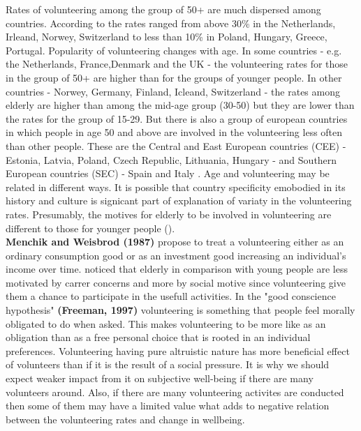\documentclass[10pt, letterpaper]{article}
\newcommand{\emd}[1]{\ExecuteMetaData[/tmp/tex]{#1}} %
\begin{document}
\begin{spacing}{1.4} %






Rates of volunteering among the group of 50+ are much dispersed among countries. According to \citet{Oecd16}the rates ranged from above 30\% in the Netherlands, Irleand, Norwey, Switzerland to less than 10\% in Poland, Hungary, Greece, Portugal. Popularity of volunteering changes with age. In some countries - e.g. the Netherlands, France,Denmark and the UK  - the volunteering rates for those in the group of 50+ are higher than for the groups of younger people. In other countries - Norwey, Germany, Finland, Icleand, Switzerland  - the rates among elderly are higher than among the mid-age group (30-50) but they are lower than the rates for the group of 15-29. But there is also a group of european countries in which people in age 50 and above are involved in the volunteering less often than other people. These are the Central and East European countries (CEE) - Estonia, Latvia, Poland, Czech Republic, Lithuania, Hungary - and  Southern European countries (SEC) - Spain and Italy \citet{Oecd16}.  Age and volunteering may be related in different ways. It is possible that country specificity emobodied in its history and culture is signicant part of explanation of variaty in the volunteering rates. Presumably, the motives for elderly to be involved in volunteering are different to those for younger people (\citet{wilson12}). \\

\textbf{Menchik and Weisbrod (1987)} propose to treat a volunteering either as an ordinary consumption good or as an investment good increasing an individual's income over time. \citet{haski09} noticed that elderly in comparison with young people are less motivated by carrer concerns and  more by social motive since volunteering give them  a  chance to participate in the usefull activities. In the "good conscience hypothesis" \textbf{(Freeman, 1997)} volunteering is something that people feel morally obligated to do when asked. This makes volunteering to be more like as an obligation than as a free personal choice that is rooted in an individual preferences. Volunteering having pure altruistic nature has more beneficial effect of volunteers than if it is the result of a social pressure. It is why we should expect weaker impact from it on subjective well-being if there are many volunteers around. Also, if there are many volunteering activites are conducted then some of them may have a limited value what adds to negative relation between the volunteering rates and change in wellbeing. \\


\end{spacing}
\end{document}
